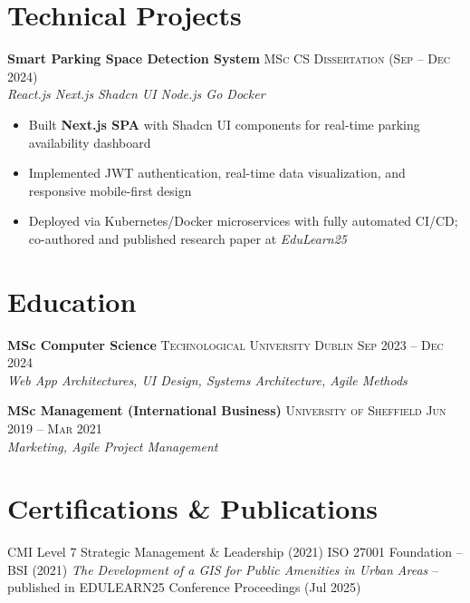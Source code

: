 \documentclass{simpleresume}
\begin{document}
\section{Technical Projects}
\noindent\textbf{Smart Parking Space Detection System}
  \hfill{\sffamily\scshape\small\color{muted}MSc CS Dissertation (Sep -- Dec 2024)}\\
  {\itshape\color{accent}\footnotesize React.js \quad\textbullet\quad Next.js \quad\textbullet\quad Shadcn UI \quad\textbullet\quad Node.js \quad\textbullet\quad Go \quad\textbullet\quad Docker}
\vspace{-0.25mm}
\begin{itemize}
  \item Built \textbf{Next.js SPA} with Shadcn UI components for real-time parking availability dashboard
  \item Implemented JWT authentication, real-time data visualization, and responsive mobile-first design
  \item Deployed via Kubernetes/Docker microservices with fully automated CI/CD; co-authored and published research paper at \textit{EduLearn25}
\end{itemize}

\section{Education}
\noindent\textbf{MSc Computer Science}
  \hfill{\sffamily\scshape\small\color{secondary}Technological University Dublin}
  \hfill{\sffamily\scshape\small\color{muted}Sep 2023 -- Dec 2024}\\
  {\itshape\color{secondary}Web App Architectures, UI Design, Systems Architecture, Agile Methods}

\vspace{0.08cm}
\noindent\textbf{MSc Management (International Business)}
  \hfill{\sffamily\scshape\small\color{secondary}University of Sheffield}
  \hfill{\sffamily\scshape\small\color{muted}Jun 2019 -- Mar 2021}\\
  {\itshape\color{secondary}Marketing, Agile Project Management}

\section{Certifications \& Publications}
\noindent
{\sffamily\small\color{secondary}
  CMI Level 7 Strategic Management \& Leadership (2021) \quad\textbullet\quad
  ISO 27001 Foundation -- BSI (2021) \quad\textbullet\quad
  \textit{The Development of a GIS for Public Amenities in Urban Areas} -- published in EDULEARN25 Conference Proceedings (Jul 2025)
}
\end{document}
